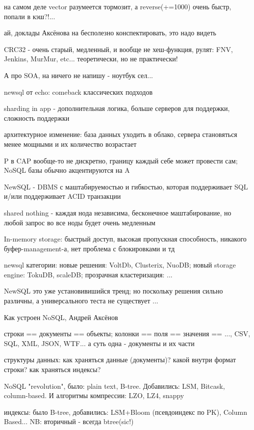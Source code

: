   \item на самом деле vector разумеется тормозит, а reverse(+=1000) очень быстр, попали в кэш?!...
  \item ай, доклады Аксёнова на бесполезно конспектировать, это надо видеть
  \item CRC32 - очень старый, медленный, и вообще не хеш-функция, рулят: FNV, Jenkins, MurMur, etc... теоретически, но не практически!
  \item А про SOA, на ничего не напишу - ноутбук сел...
  \item newsql от echo: comeback классических подходов
  \item sharding in app - дополнительная логика, больше серверов для поддержки, сложность поддержки
  \item архитектурное изменение: база данных уходить в облако, сервера становяться менее мощными и их количество возрастает
  \item P в CAP вообще-то не дискретно, границу каждый себе может провести сам; NoSQL базы обычно акцентируются на A
  \item NewSQL - DBMS с маштабируемостью и гибкостью, которая поддерживает SQL и/или поддерживает ACID транзакции
  \item shared nothing - каждая нода независима, бесконечное маштабирование, но любой запрос во все ноды будет очень медленным
  \item In-memory storage: быстрый доступ, высокая пропускная способность, никакого буфер-management-а, нет проблема с блокировками и тд
  \item newsql категории: новые решения: VoltDb, Clusterix, NuoDB; новый storage engine: TokuDB, scaleDB; прозрачная кластеризация: ...
  \item NewSQL это уже установивишийся тренд; но поскольку решения сильно различны, а универсального теста не существует ...
  \item Как устроен NoSQL, Андрей Аксёнов
  \item строки == документы == объекты; колонки == поля == значения == ..., CSV, SQL, XML, JSON, WTF... а суть одна - документы и их части
  \item структуры данных: как храняться данные (документы)? какой внутри формат строки? как храняться индексы?
  \item NoSQL "revolution", было: plain text, B-tree. Добавились: LSM, Bitcask, column-based. И алгоритмы компрессии: LZO, LZ4, snappy
  \item индексы: было B-tree, добавились: LSM+Bloom (псевдоиндекс по PK), Column Based... NB: вторичный - всегда btree(sic!)
